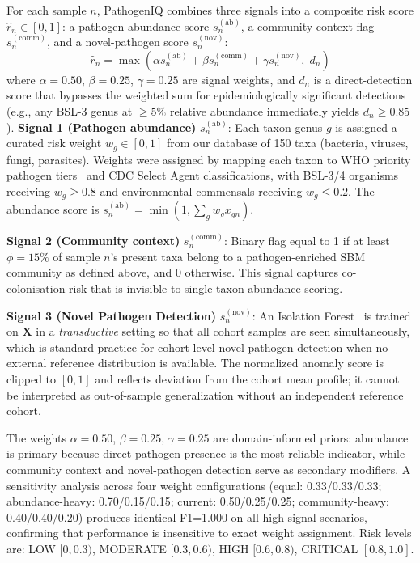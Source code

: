 \documentclass[conference]{IEEEtran}
\begin{document}
For each sample $n$, PathogenIQ combines three signals into a composite
risk score $\hat{r}_n \in [0,1]$: a pathogen abundance score
$s_n^{(\text{ab})}$, a community context flag $s_n^{(\text{comm})}$,
and a novel-pathogen score $s_n^{(\text{nov})}$:
%
\begin{equation}
\hat{r}_n = \max\!\left(
  \alpha s_n^{(\text{ab})} + \beta s_n^{(\text{comm})} + \gamma s_n^{(\text{nov})},\;
  d_n
\right)
\label{eq:risk}
\end{equation}
%
where $\alpha=0.50$, $\beta=0.25$, $\gamma=0.25$ are signal weights,
and $d_n$ is a direct-detection score that bypasses the weighted sum
for epidemiologically significant detections (e.g., any BSL-3 genus
at $\geq 5\%$ relative abundance immediately yields $d_n \geq 0.85$).
\textbf{Signal 1 (Pathogen abundance)} $s_n^{(\text{ab})}$:
Each taxon genus $g$ is assigned a curated risk weight $w_g \in [0,1]$
from our database of 150 taxa (bacteria, viruses, fungi, parasites).
Weights were assigned by mapping each taxon to WHO priority pathogen
tiers~\cite{WHO2024} and CDC Select Agent classifications, with BSL-3/4
organisms receiving $w_g \geq 0.8$ and environmental commensals
receiving $w_g \leq 0.2$.
The abundance score is $s_n^{(\text{ab})} = \min(1, \sum_{g} w_g x_{gn})$.

\textbf{Signal 2 (Community context)} $s_n^{(\text{comm})}$:
Binary flag equal to 1 if at least $\phi=15\%$ of sample $n$'s present
taxa belong to a pathogen-enriched SBM community as defined above, and 0
otherwise. This signal captures co-colonisation risk that is invisible to
single-taxon abundance scoring.

\textbf{Signal 3 (Novel Pathogen Detection)} $s_n^{(\text{nov})}$:
An Isolation Forest~\cite{Liu2008,Chandola2009} is trained on $\mathbf{X}$
in a \emph{transductive} setting so that all cohort samples are seen
simultaneously, which is standard practice for cohort-level novel
pathogen detection when no external reference distribution is available.
The normalized anomaly score is clipped to $[0,1]$ and reflects
deviation from the cohort mean profile; it cannot be interpreted as
out-of-sample generalization without an independent reference cohort.

The weights $\alpha=0.50$, $\beta=0.25$, $\gamma=0.25$ are
domain-informed priors: abundance is primary because direct pathogen
presence is the most reliable indicator, while community context and
novel-pathogen detection serve as secondary modifiers. A sensitivity analysis across
four weight configurations (equal: 0.33/0.33/0.33; abundance-heavy:
0.70/0.15/0.15; current: 0.50/0.25/0.25; community-heavy:
0.40/0.40/0.20) produces identical F1=1.000 on all high-signal
scenarios, confirming that performance is insensitive to exact weight
assignment. Risk levels are: LOW $[0, 0.3)$, MODERATE $[0.3, 0.6)$,
HIGH $[0.6, 0.8)$, CRITICAL $[0.8, 1.0]$.
\end{document}
